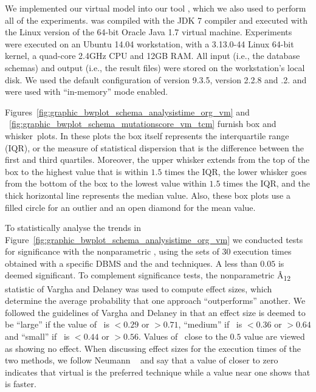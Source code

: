 
We implemented our virtual model into our \SA tool \cite{Kapfhammer2013,McMinn2015,Wright2014}, which we also used to
perform all of the experiments. \SA was compiled with the JDK 7 compiler and executed with the Linux version of the 64-bit Oracle Java 1.7 virtual machine.  Experiments were executed on an Ubuntu 14.04 workstation, with a 3.13.0-44 Linux 64-bit kernel, a quad-core 2.4GHz CPU and 12GB RAM. All input (i.e., the database schemas) and output (i.e., the result files) were stored on the workstation's local disk. We used the default configuration of \PostgreSQL version 9.3.5, \HyperSQL version 2.2.8 and .2.  \HyperSQL and \SQLite were used with ``in-memory'' mode enabled.


 Figures~\ref{fig:graphic_bwplot_schema_analysistime_org_vm} and ~\ref{fig:graphic_bwplot_schema_mutationscore_vm_tcm} furnish box and \mbox{whisker plots}.  In these plots the box itself represents the interquartile range (IQR), or the measure of statistical dispersion that is the difference between the first and third quartiles. Moreover, the upper whisker extends from the top of the box to the highest value that is within $1.5$ times the IQR, the lower whisker goes from the bottom of the box to the lowest value within $1.5$ times the IQR, and the thick horizontal line represents the median value. Also, these box plots use a filled circle for an outlier and an open diamond for the mean value.


\begin{sloppypar}
To statistically analyse the trends in Figure~\ref{fig:graphic_bwplot_schema_analysistime_org_vm} we conducted tests for significance with the nonparametric \wilcoxon, using the sets of 30 execution times obtained with a specific DBMS and the \Original and \vma techniques.  A \mbox{\pvalue} less than $0.05$ is deemed significant.  To complement significance tests, the nonparametric \^{A}\textsubscript{12} statistic of Vargha and Delaney \cite{Vargha2000} was used to compute effect sizes, which determine the average probability that one approach ``outperforms'' another.  We followed the guidelines of Vargha and Delaney in that an effect size is deemed to be ``large'' if the value of \atwelve~is $< 0.29$ or $> 0.71$, ``medium'' if \atwelve~is $< 0.36$ or $> 0.64$ and ``small'' if \atwelve~is $< 0.44$ or $> 0.56$.  Values of \atwelve~close to the $0.5$ value are viewed as showing no effect.  When discussing effect sizes for the execution times of the two methods, we follow Neumann \etal~\cite{Neumann2015} and say that a value of \atwelve closer to zero indicates that virtual is the preferred technique while a value near one shows that \Original is faster.
\end{sloppypar}

